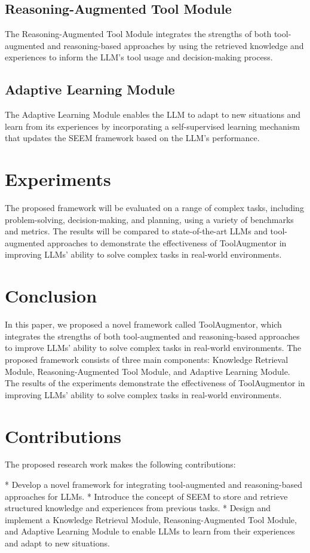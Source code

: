 \documentclass[12pt, a4paper]{article}
\begin{document}
\subsection{Reasoning-Augmented Tool Module}
\label{subsec:reasoning_augmented_tool_module}
The Reasoning-Augmented Tool Module integrates the strengths of both tool-augmented and reasoning-based approaches by using the retrieved knowledge and experiences to inform the LLM's tool usage and decision-making process.

\subsection{Adaptive Learning Module}
\label{subsec:adaptive_learning_module}
The Adaptive Learning Module enables the LLM to adapt to new situations and learn from its experiences by incorporating a self-supervised learning mechanism that updates the SEEM framework based on the LLM's performance.

\section{Experiments}
\label{sec:experiments}
The proposed framework will be evaluated on a range of complex tasks, including problem-solving, decision-making, and planning, using a variety of benchmarks and metrics. The results will be compared to state-of-the-art LLMs and tool-augmented approaches to demonstrate the effectiveness of ToolAugmentor in improving LLMs' ability to solve complex tasks in real-world environments.

\section{Conclusion}
\label{sec:conclusion}
In this paper, we proposed a novel framework called ToolAugmentor, which integrates the strengths of both tool-augmented and reasoning-based approaches to improve LLMs' ability to solve complex tasks in real-world environments. The proposed framework consists of three main components: Knowledge Retrieval Module, Reasoning-Augmented Tool Module, and Adaptive Learning Module. The results of the experiments demonstrate the effectiveness of ToolAugmentor in improving LLMs' ability to solve complex tasks in real-world environments.

\section{Contributions}
\label{sec:contributions}
The proposed research work makes the following contributions:

*   Develop a novel framework for integrating tool-augmented and reasoning-based approaches for LLMs.
*   Introduce the concept of SEEM to store and retrieve structured knowledge and experiences from previous tasks.
*   Design and implement a Knowledge Retrieval Module, Reasoning-Augmented Tool Module, and Adaptive Learning Module to enable LLMs to learn from their experiences and adapt to new situations.
\end{document}
